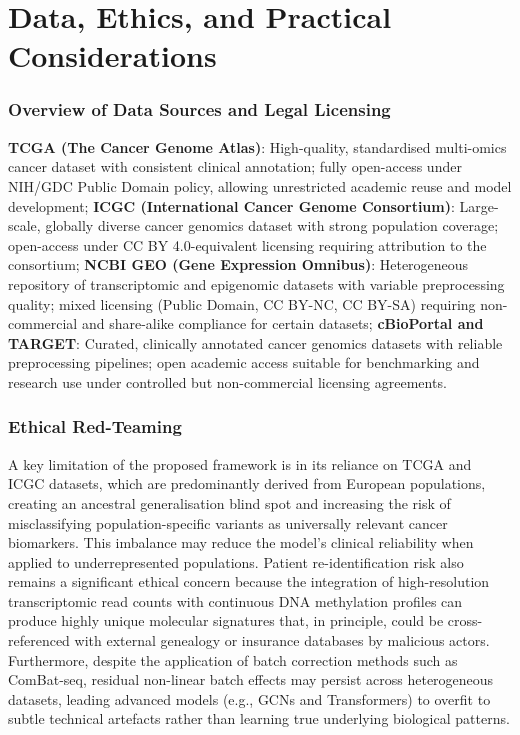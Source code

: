 \documentclass[conference]{IEEEtran}
\begin{document}
\section{Data, Ethics, and Practical Considerations}
\subsubsection{Overview of Data Sources and Legal Licensing}
\textbf{TCGA (The Cancer Genome Atlas)}: High-quality, standardised multi-omics cancer dataset with consistent clinical annotation; fully open-access under NIH/GDC Public Domain policy, allowing unrestricted academic reuse and model development; \textbf{ICGC (International Cancer Genome Consortium)}: Large-scale, globally diverse cancer genomics dataset with strong population coverage; open-access under CC BY 4.0-equivalent licensing requiring attribution to the consortium; \textbf{NCBI GEO (Gene Expression Omnibus)}: Heterogeneous repository of transcriptomic and epigenomic datasets with variable preprocessing quality; mixed licensing (Public Domain, CC BY-NC, CC BY-SA) requiring non-commercial and share-alike compliance for certain datasets; \textbf{cBioPortal and TARGET}: Curated, clinically annotated cancer genomics datasets with reliable preprocessing pipelines; open academic access suitable for benchmarking and research use under controlled but non-commercial licensing agreements.
\subsubsection{Ethical Red-Teaming} A key limitation of the proposed framework is in its reliance on TCGA and ICGC datasets, which are predominantly derived from European populations, creating an ancestral generalisation blind spot and increasing the risk of misclassifying population-specific variants as universally relevant cancer biomarkers. This imbalance may reduce the model’s clinical reliability when applied to underrepresented populations. Patient re-identification risk also remains a significant ethical concern because the integration of high-resolution transcriptomic read counts with continuous DNA methylation profiles can produce highly unique molecular signatures that, in principle, could be cross-referenced with external genealogy or insurance databases by malicious actors. Furthermore, despite the application of batch correction methods such as ComBat-seq, residual non-linear batch effects may persist across heterogeneous datasets, leading advanced models (e.g., GCNs and Transformers) to overfit to subtle technical artefacts rather than learning true underlying biological patterns.
\end{document}

